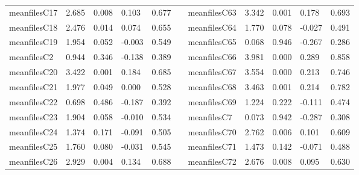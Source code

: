 \begin{table}[h!]
\begin{tabular}{lllllllllll}
meanfilesC17  & 2.685            & 0.008            & 0.103               & 0.677               &           & meanfilesC63  & 3.342            & 0.001            & 0.178               & 0.693               \\
meanfilesC18  & 2.476            & 0.014            & 0.074               & 0.655               &           & meanfilesC64  & 1.770            & 0.078            & -0.027              & 0.491               \\
meanfilesC19  & 1.954            & 0.052            & -0.003              & 0.549               &           & meanfilesC65  & 0.068            & 0.946            & -0.267              & 0.286               \\
meanfilesC2   & 0.944            & 0.346            & -0.138              & 0.389               &           & meanfilesC66  & 3.981            & 0.000            & 0.289               & 0.858               \\
meanfilesC20  & 3.422            & 0.001            & 0.184               & 0.685               &           & meanfilesC67  & 3.554            & 0.000            & 0.213               & 0.746               \\
meanfilesC21  & 1.977            & 0.049            & 0.000               & 0.528               &           & meanfilesC68  & 3.463            & 0.001            & 0.214               & 0.782               \\
meanfilesC22  & 0.698            & 0.486            & -0.187              & 0.392               &           & meanfilesC69  & 1.224            & 0.222            & -0.111              & 0.474               \\
meanfilesC23  & 1.904            & 0.058            & -0.010              & 0.534               &           & meanfilesC7   & 0.073            & 0.942            & -0.287              & 0.308               \\
meanfilesC24  & 1.374            & 0.171            & -0.091              & 0.505               &           & meanfilesC70  & 2.762            & 0.006            & 0.101               & 0.609               \\
meanfilesC25  & 1.760            & 0.080            & -0.031              & 0.545               &           & meanfilesC71  & 1.473            & 0.142            & -0.071              & 0.488               \\
meanfilesC26  & 2.929            & 0.004            & 0.134               & 0.688               &           & meanfilesC72  & 2.676            & 0.008            & 0.095               & 0.630               \\

\end{tabular}
\end{table}
